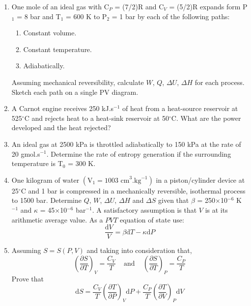 \documentclass[12pts,a4paper,amsmath,amssymb,floatfix]{article}%
\renewcommand{\d}{\mathrm{d}}
\newcommand{\frc}{\displaystyle\frac}
\begin{document}
\begin{enumerate}[label=\bfseries Problem \arabic*:]
\item\label{Tut02:IdealGas2} One mole of an ideal gas with C$_{P}$ = (7/2)R and C$_{V}$ = (5/2)R expands form P$_{1}$ = 8 bar and T$_{1}$ = 600 K to P$_{2}$ = 1 bar by each of the following paths:
\begin{enumerate}
\item Constant volume.%
\item Constant temperature.%
\item Adiabatically.%
\end{enumerate}
Assuming mechanical reversibility, calculate $W$, $Q$, $\Delta U$, $\Delta H$ for each process. Sketch each path on a single PV diagram.


\item\label{Tut02:Carnot}A Carnot engine receives 250 kJ.s$^{-1}$ of heat from a heat-source reservoir at 525$^{\circ}$C and rejects heat to a heat-sink reservoir at 50$^{\circ}$C. What are the power developed and the heat rejected?%

\item\label{Tut02:IdealGas3}An ideal gas at 2500 kPa is throttled adiabatically to 150 kPa at the rate of 20 gmol.s$^{-1}$. Determine the rate of entropy generation if the surrounding temperature is T$_{0}$ = 300 K. %


\item\label{Tut02:CylinderPiston2}One kilogram of water $\left(\text{V}_{1} = \text{1003 cm}^{3}\text{.kg}^{-1}\right)$ in a piston/cylinder device at 25$^{\circ}$C and 1 bar is compressed in a mechanically reversible, isothermal process to 1500 bar. Determine $Q$, $W$, $\Delta U$, $\Delta H$ and $\Delta S$ given that $\beta$ = 250$\times$10$^{-6}$ K$^{-1}$ and $\kappa$ = 45$\times$10$^{-6}$ bar$^{-1}$. A satisfactory assumption is that $V$ is at its arithmetic average value. As a $PVT$ equation of state use:%
\begin{displaymath}
\displaystyle\frac{\d V}{V} = \beta \d T - \kappa \d P
\end{displaymath}


\item\label{Tut02:Demonstration}Assuming $S = S\left(P,V\right)$ and taking into consideration that,
\begin{displaymath}
\left(\frc{\partial S}{\partial T}\right)_{V} = \frc{C_{V}}{T}\;\;\;\text{ and }\;\;\; \left(\frc{\partial S}{\partial T}\right)_{P} = \frc{C_{P}}{T}
\end{displaymath}
Prove that 
\begin{displaymath}
\d S = \frc{C_{V}}{T}\left(\frc{\partial T}{\partial P}\right)_{V}\d P + \frc{C_{P}}{T}\left(\frc{\partial T}{\partial V}\right)_{P}\d V
\end{displaymath}



\end{enumerate}
\end{document}
